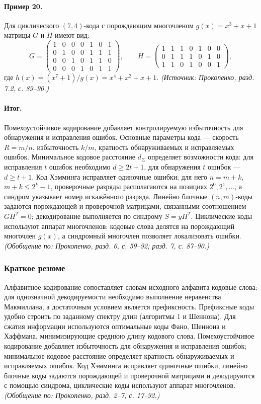 \documentclass[a4paper,12pt]{article}
\begin{document}
\paragraph{Пример 20.}
Для циклического \((7,4)\)-кода с порождающим многочленом \(g(x)=x^3+x+1\) матрицы \(G\) и \(H\) имеют вид:
\[
G=\begin{pmatrix}
1&0&0&0&1&0&1\\
0&1&0&0&1&1&1\\
0&0&1&0&1&1&0\\
0&0&0&1&0&1&1
\end{pmatrix},
\qquad
H=\begin{pmatrix}
1&1&1&0&1&0&0\\
0&1&1&1&0&1&0\\
1&1&0&1&0&0&1
\end{pmatrix},
\]
где \(h(x)=(x^7+1)/g(x)=x^4+x^2+x+1\).
\textit{(Источник: Прокопенко, разд. 7.2, с. 89--90.)}

\paragraph{Итог.}
Помехоустойчивое кодирование добавляет контролируемую избыточность для обнаружения и исправления ошибок. Основные параметры кода — скорость \(R=m/n\), избыточность \(k/m\), кратность обнаруживаемых и исправляемых ошибок. Минимальное кодовое расстояние \(d_\Sigma\) определяет возможности кода: для исправления \(t\) ошибок необходимо \(d\ge2t+1\), для обнаружения \(t\) ошибок — \(d\ge t+1\). Код Хэмминга исправляет одиночные ошибки; для него \(n=m+k\), \(m+k\le2^k-1\), проверочные разряды располагаются на позициях \(2^0,2^1,\dots\), а синдром указывает номер искажённого разряда. Линейно блочные \((n,m)\)-коды задаются порождающей и проверочной матрицами, связанными соотношением \(GH^T=0\); декодирование выполняется по синдрому \(S=yH^T\). Циклические коды используют аппарат многочленов: кодовые слова делятся на порождающий многочлен \(g(x)\), а синдромный многочлен позволяет локализовать ошибки.
\textit{(Обобщение по: Прокопенко, разд. 6, с. 59--92; разд. 7, с. 87--90.)}

\subsubsection{Краткое резюме}

Алфавитное кодирование сопоставляет словам исходного алфавита кодовые слова; для однозначной декодируемости необходимо выполнение неравенства Макмиллана, а достаточным условием является префиксность. Префиксные коды удобно строить по заданному спектру длин (алгоритмы 1 и Шеннона). Для сжатия информации используются оптимальные коды Фано, Шеннона и Хаффмана, минимизирующие среднюю длину кодового слова. Помехоустойчивое кодирование добавляет избыточность для обнаружения и исправления ошибок; минимальное кодовое расстояние определяет кратность обнаруживаемых и исправляемых ошибок. Код Хэмминга исправляет одиночные ошибки, линейно блочные коды задаются порождающей и проверочной матрицами и декодируются с помощью синдрома, циклические коды используют аппарат многочленов.
\textit{(Обобщение по: Прокопенко, разд. 2--7, с. 17--92.)}
\end{document}
